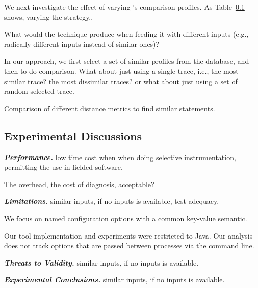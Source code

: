 We next investigate the effect of varying \ourtool's
comparison profiles. As Table~\ref{} shows, varying the
strategy..


What would the technique produce when feeding it with different inputs (e.g.,
radically different inputs instead of similar ones)?

In our approach, we first select a set of similar profiles from the  database,
and then to do comparison. What about just using a single trace, i.e., the
most similar trace? the most dissimilar traces? or what about just using a set
of random selected trace.

Comparison of different distance metrics to find similar statements.




\subsection{Experimental Discussions}

\noindent \textbf{\textit{Performance.}} low time cost when when doing
selective instrumentation, permitting the use in fielded software.

The overhead, the cost of diagnosis, acceptable?

\vspace{1mm}

\noindent \textbf{\textit{Limitations.}} similar inputs, if no inputs is available, test adequacy.

We focus on named configuration options with a common key-value semantic.

Our tool implementation and experiments were restricted to Java. Our analysis
does not track options that are passed between processes via the command line.

\vspace{1mm}

\noindent \textbf{\textit{Threats to Validity.}} similar inputs, if no inputs is available.

\vspace{1mm}

\noindent \textbf{\textit{Experimental Conclusions.}} similar inputs, if no inputs is available.

